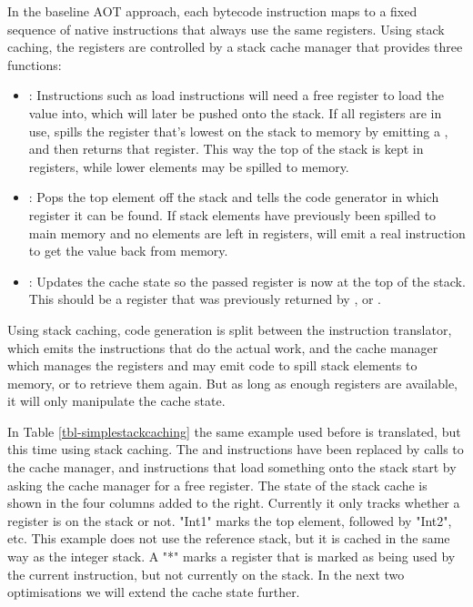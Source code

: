 In the baseline AOT approach, each bytecode instruction maps to a fixed sequence of native instructions that always use the same registers. Using stack caching, the registers are controlled by a stack cache manager that provides three functions:
\begin{itemize}
    \item {}: Instructions such as load instructions will need a free register to load the value into, which will later be pushed onto the stack. If all registers are in use,  spills the register that's lowest on the stack to memory by emitting a , and then returns that register. This way the top of the stack is kept in registers, while lower elements may be spilled to memory.
    \item {}: Pops the top element off the stack and tells the code generator in which register it can be found. If stack elements have previously been spilled to main memory and no  elements are left in registers,  will emit a real  instruction to get the value back from memory.
    \item {}: Updates the cache state so the passed register is now at the top of the stack. This should be a register that was previously returned by , or .
\end{itemize}

Using stack caching, code generation is split between the instruction translator, which emits the instructions that do the actual work, and the cache manager which manages the registers and may emit code to spill stack elements to memory, or to retrieve them again. But as long as enough registers are available, it will only manipulate the cache state.

In Table \ref{tbl-simplestackcaching} the same example used before is translated, but this time using stack caching. The  and  instructions have been replaced by calls to the cache manager, and instructions that load something onto the stack start by asking the cache manager for a free register. The state of the stack cache is shown in the four columns added to the right. Currently it only tracks whether a register is on the stack or not. "Int1" marks the top element, followed by "Int2", etc. This example does not use the reference stack, but it is cached in the same way as the integer stack. A "*" marks a register that is marked as being used by the current instruction, but not currently on the stack. In the next two optimisations we will extend the cache state further.
 
